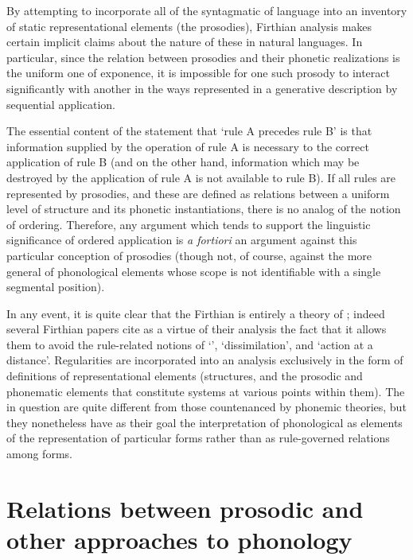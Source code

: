 By attempting to incorporate all of the syntagmatic  of
language into an inventory of static representational elements (the
prosodies), Firthian analysis makes certain implicit claims about the
nature of these  in natural languages. In particular,
since the relation between prosodies and their phonetic realizations
is the uniform one of exponence, it is impossible for one such prosody
to interact significantly with another in the ways represented in a
generative description by sequential application.

The essential content of the statement that `rule A precedes rule B'
is that information supplied by the operation of rule A is necessary
to the correct application of rule B (and on the other hand,
information which may be destroyed by the application of rule A is not
available to rule B). If all rules are represented by prosodies, and
these are defined as relations between a uniform level of structure
and its phonetic instantiations, there is no analog of the notion of
ordering. Therefore, any argument which tends to support the
linguistic significance of ordered application is \emph{a fortiori} an
argument against this particular conception of prosodies (though not,
of course, against the more general  of phonological elements
whose scope is not identifiable with a single segmental position).

In any event, it is quite clear that the Firthian  is
entirely a theory of ; indeed several Firthian papers
cite as a virtue of their analysis the fact that it allows them to
avoid the rule-related notions of `', `dissimilation', and
`action at a distance'. Regularities are incorporated into an analysis
exclusively in the form of definitions of representational elements
(structures, and the prosodic and phonematic elements that constitute
systems at various points within them). The  in
question are quite different from those countenanced by phonemic
theories, but they nonetheless have as their goal the interpretation
of phonological  as elements of the representation of
particular forms rather than as rule-governed relations among forms.

\section{Relations between prosodic and other approaches to phonology}

